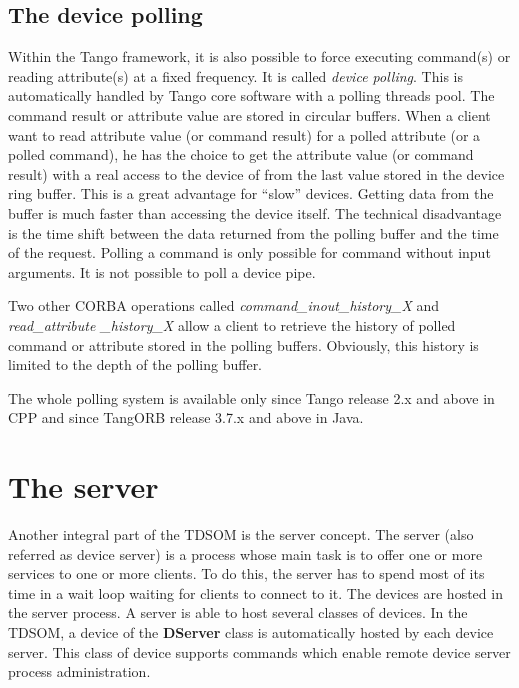 \subsection{The device polling}

Within the Tango framework, it is also possible to force executing
command(s) or reading attribute(s) at a fixed frequency. It is called
\emph{device polling}. This is automatically handled by Tango core
software with a polling threads pool. The command result or attribute
value are stored in circular buffers. When a client want to read attribute
value (or command result) for a polled attribute (or a polled command),
he has the choice to get the attribute value (or command result) with
a real access to the device of from the last value stored in the device
ring buffer. This is a great advantage for ``slow'' devices. Getting
data from the buffer is much faster than accessing the device itself.
The technical disadvantage is the time shift between the data returned
from the polling buffer and the time of the request. Polling a command
is only possible for command without input arguments. It is not possible
to poll a device pipe.

Two other CORBA operations called \emph{command\_inout\_history\_X}
and \emph{read\_attribute \_history\_X}
allow a client to retrieve the history of polled command or attribute
stored in the polling buffers. Obviously, this history is limited
to the depth of the polling buffer. 

The whole polling system is available only since Tango release 2.x
and above in CPP and since TangORB release 3.7.x and above in Java.

\section{The server}

Another integral part of the TDSOM is the server concept. The server
(also referred as device server) is a process whose
main task is to offer one or more services to one or more clients.
To do this, the server has to spend most of its time in a wait loop
waiting for clients to connect to it. The devices are hosted in the
server process. A server is able to host several classes of devices.
In the TDSOM, a device of the \textbf{DServer} class is automatically
hosted by each device server. This class of device supports commands
which enable remote device server process administration.

